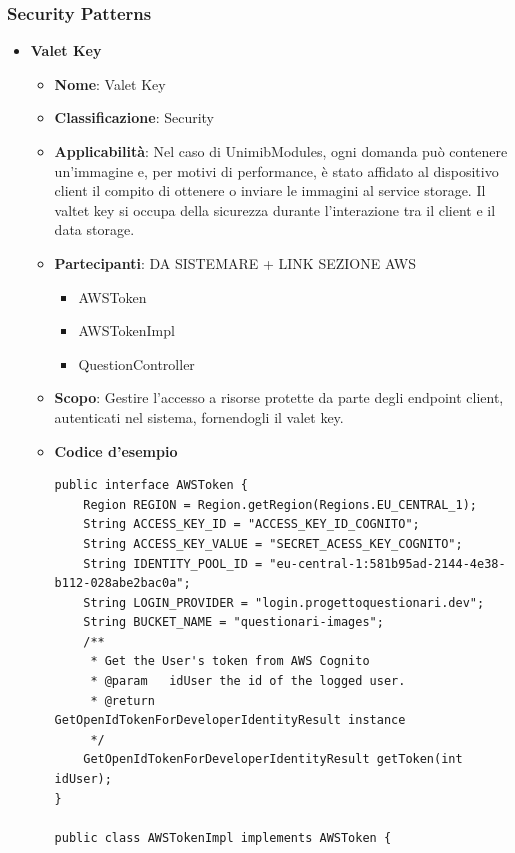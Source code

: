 \documentclass[12pt]{article}
\begin{document}
\subsubsection{Security Patterns}
	\begin{itemize}
		\item \textbf{Valet Key}
    	\begin{itemize}
            \item \textbf{Nome}: Valet Key
            \item \textbf{Classificazione}: Security
            \item \textbf{Applicabilità}: Nel caso di UnimibModules, ogni domanda può contenere un'immagine e, per motivi di performance, è stato affidato al dispositivo client il compito di ottenere o inviare le immagini al service storage. Il valtet key si occupa della sicurezza durante l'interazione tra il client e il data storage.
            \item \textbf{Partecipanti}: DA SISTEMARE + LINK SEZIONE AWS
                \begin{itemize}
                    \item {AWSToken}
                    \item {AWSTokenImpl}
                    \item {QuestionController}
                \end{itemize}
            \item \textbf{Scopo}: Gestire l'accesso a risorse protette da parte degli endpoint client, autenticati nel sistema, fornendogli il valet key.
             \item \textbf{Codice d'esempio}
             \begin{lstlisting}
public interface AWSToken {
    Region REGION = Region.getRegion(Regions.EU_CENTRAL_1);
    String ACCESS_KEY_ID = "ACCESS_KEY_ID_COGNITO";
    String ACCESS_KEY_VALUE = "SECRET_ACESS_KEY_COGNITO";
    String IDENTITY_POOL_ID = "eu-central-1:581b95ad-2144-4e38-b112-028abe2bac0a";
    String LOGIN_PROVIDER = "login.progettoquestionari.dev";
    String BUCKET_NAME = "questionari-images";
    /**
     * Get the User's token from AWS Cognito
     * @param	idUser the id of the logged user.
     * @return				GetOpenIdTokenForDeveloperIdentityResult instance
     */
    GetOpenIdTokenForDeveloperIdentityResult getToken(int idUser);
}

public class AWSTokenImpl implements AWSToken {


\end{lstlisting}
\end{itemize}
\end{itemize}
\end{document}
